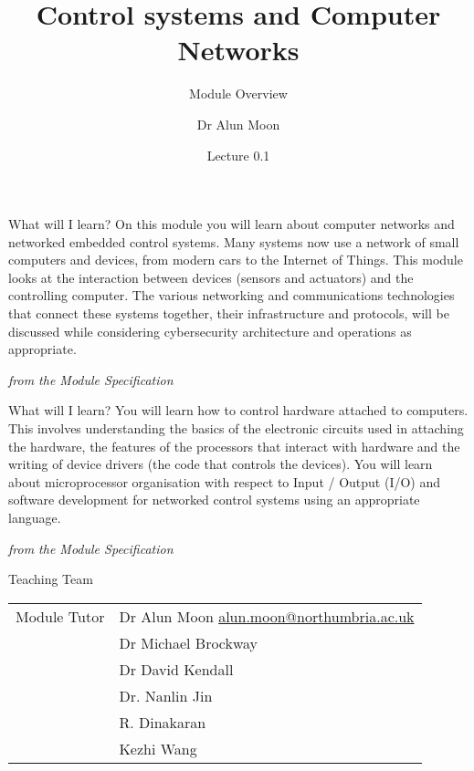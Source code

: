 \documentclass[xcolor=svgnames]{beamer}
\title{Control systems and Computer Networks}
\subtitle{Module Overview}
\author{Dr Alun Moon}
\date{Lecture 0.1}
\begin{document}
\frame{\maketitle}

\begin{frame}{What will I learn?}
On this module you will learn about computer networks and networked embedded control systems. Many systems now use a network of small
    computers and devices, from modern cars to the Internet of Things. This module looks at the interaction between devices (sensors and
    actuators) and the controlling computer. The various networking and communications technologies that connect these systems together, their
    infrastructure and protocols, will be discussed while considering cybersecurity architecture and operations as appropriate.

    \hspace*{\fill}\emph{from the Module Specification}
\end{frame}
\begin{frame}{What will I learn?}
    You will learn how to control hardware attached to computers. This involves understanding the basics of the electronic circuits used in
    attaching the hardware, the features of the processors that interact with hardware and the writing of device drivers (the code that controls the
    devices). You will learn about microprocessor organisation with respect to Input / Output (I/O) and software development for networked
    control systems using an appropriate language.

    \hspace*{\fill}\emph{from the Module Specification}
\end{frame}

\begin{frame}{Teaching Team}
\begin{tabular}{ll}
Module Tutor & Dr Alun Moon  \hfill\url{alun.moon@northumbria.ac.uk} \\
    & Dr Michael Brockway \\
    & Dr David Kendall \\
    & Dr. Nanlin Jin \\
    & R. Dinakaran \\
    & Kezhi Wang
\end{tabular}
\end{frame}
\end{document}
